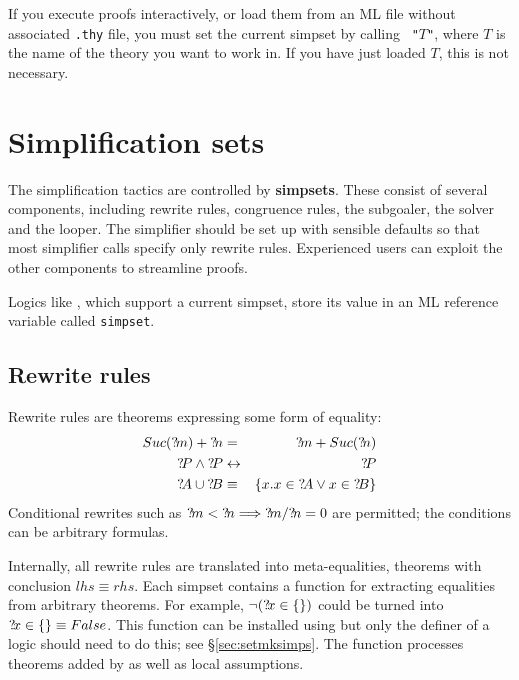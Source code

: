 \begin{warn}
  If you execute proofs interactively, or load them from an ML file without
  associated {\tt .thy} file, you must set the current simpset by calling
  ~{\tt"}$T${\tt"}, where $T$ is the name of the
  theory you want to work in.  If you have just loaded $T$, this is not
  necessary.
\end{warn}


\section{Simplification sets} 
The simplification tactics are controlled by {\bf simpsets}.  These
consist of several components, including rewrite rules, congruence
rules, the subgoaler, the solver and the looper.  The simplifier
should be set up with sensible defaults so that most simplifier calls
specify only rewrite rules.  Experienced users can exploit the other
components to streamline proofs.

Logics like \HOL, which support a current
simpset, store its value in an ML reference
variable called {\tt simpset}.

\subsection{Rewrite rules}
Rewrite rules are theorems expressing some form of equality:
\begin{eqnarray*}
  Suc(\Var{m}) + \Var{n} &=&      \Var{m} + Suc(\Var{n}) \\
  \Var{P}\conj\Var{P}    &\bimp&  \Var{P} \\
  \Var{A} \un \Var{B} &\equiv& \{x.x\in \Var{A} \disj x\in \Var{B}\}
\end{eqnarray*}
Conditional rewrites such as ${?\!m}<{?\!n} \Longrightarrow {?\!m}/{?\!n} =
0$ are permitted; the conditions can be arbitrary formulas.

Internally, all rewrite rules are translated into meta-equalities, theorems
with conclusion $lhs \equiv rhs$.  Each simpset contains a function for
extracting equalities from arbitrary theorems.  For example,
$\neg({?\!x}\in \{\})$ could be turned into ${?\!x}\in \{\} \equiv
False$.  This function can be installed using  but only
the definer of a logic should need to do this; see \S\ref{sec:setmksimps}.
The function processes theorems added by  as well as
local assumptions.


